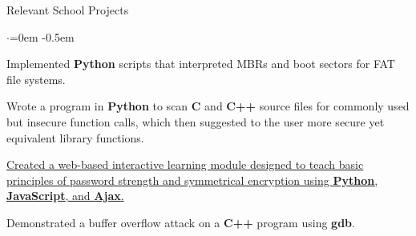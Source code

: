 \documentclass{resume} %
\begin{document}
\begin{rSection}{Relevant School Projects}
\begin{list}{$\cdot$}{\leftmargin=0em} %
   \itemsep -0.5em

	\item Implemented \textbf{Python} scripts that interpreted MBRs and boot sectors for FAT file systems.
	
	\item Wrote a program in \textbf{Python} to scan \textbf{C} and \textbf{C++} source files for commonly used but insecure function calls, which then suggested to the user more secure yet equivalent library functions.
	
	
	\item \href{http://csilm.usu.edu/~securityninja/}{Created a web-based interactive learning module designed to teach basic principles of password strength and symmetrical encryption using \textbf{Python}, \textbf{JavaScript}, and \textbf{Ajax}.}
	
	
	\item Demonstrated a buffer overflow attack on a \textbf{C++} program using \textbf{gdb}.
	
	
	
	

\end{list}

\end{rSection}
\end{document}
